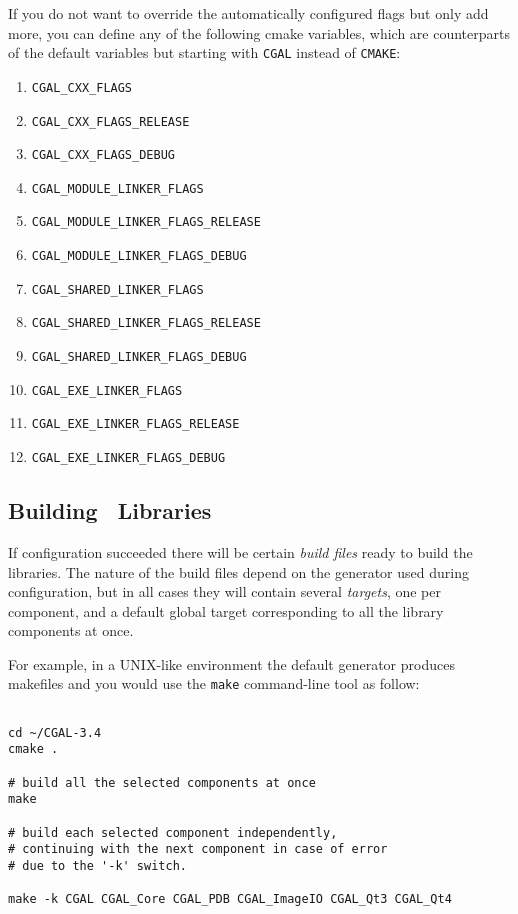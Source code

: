 If you do not want to override the automatically configured flags but only add more, you can 
define any of the following cmake variables, which are counterparts of the default
variables but starting with \texttt{CGAL} instead of \texttt{CMAKE}:

\begin{enumerate}
\item \texttt{CGAL\_CXX\_FLAGS}
\item \texttt{CGAL\_CXX\_FLAGS\_RELEASE}
\item \texttt{CGAL\_CXX\_FLAGS\_DEBUG}
\item \texttt{CGAL\_MODULE\_LINKER\_FLAGS}
\item \texttt{CGAL\_MODULE\_LINKER\_FLAGS\_RELEASE}
\item \texttt{CGAL\_MODULE\_LINKER\_FLAGS\_DEBUG}
\item \texttt{CGAL\_SHARED\_LINKER\_FLAGS}
\item \texttt{CGAL\_SHARED\_LINKER\_FLAGS\_RELEASE}
\item \texttt{CGAL\_SHARED\_LINKER\_FLAGS\_DEBUG}
\item \texttt{CGAL\_EXE\_LINKER\_FLAGS}
\item \texttt{CGAL\_EXE\_LINKER\_FLAGS\_RELEASE}
\item \texttt{CGAL\_EXE\_LINKER\_FLAGS\_DEBUG}
\end{enumerate}


\subsection{Building \cgal\ Libraries}

If configuration succeeded there will be certain {\em build files} ready to build the libraries.
The nature of the build files depend on the generator used during configuration, but in all cases they 
will contain several {\em targets}, one per component,  and a default global target corresponding 
to all the library components at once.

For example, in a UNIX-like environment the default generator produces makefiles and you would
use the \texttt{make} command-line tool as follow:

{\ccTexHtml{\scriptsize}{}
\begin{verbatim}

cd ~/CGAL-3.4
cmake .

# build all the selected components at once
make 

# build each selected component independently,
# continuing with the next component in case of error
# due to the '-k' switch.

make -k CGAL CGAL_Core CGAL_PDB CGAL_ImageIO CGAL_Qt3 CGAL_Qt4

\end{verbatim}
}

